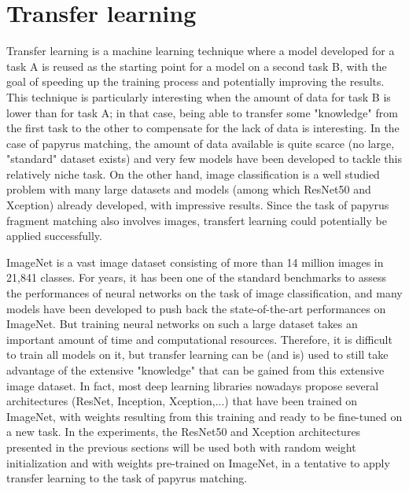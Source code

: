 \documentclass[11pt]{report}
\begin{document}
\section{Transfer learning}\label{sec:transfert}

Transfer learning is a machine learning technique where a model developed for a task A is reused as the starting point for a model on a second task B, with the goal of speeding up the training process and potentially improving the results. This technique is particularly interesting when the amount of data for task B is lower than for task A; in that case, being able to transfer some "knowledge" from the first task to the other to compensate for the lack of data is interesting.\newline
In the case of papyrus matching, the amount of data available is quite scarce (no large, "standard" dataset exists) and very few models have been developed to tackle this relatively niche task. On the other hand, image classification is a well studied problem with many large datasets and models (among which ResNet50 and Xception) already developed, with impressive results. Since the task of papyrus fragment matching also involves images, transfert learning could potentially be applied successfully.\newline

ImageNet is a vast image dataset consisting of more than 14 million images in 21,841 classes. For years, it has been one of the standard benchmarks to assess the performances of neural networks on the task of image classification, and many models have been developed to push back the state-of-the-art performances on ImageNet. But training neural networks on such a large dataset takes an important  amount of time and computational resources. Therefore, it is difficult to train all models on it, but transfer learning can be (and is) used to still take advantage of the extensive "knowledge" that can be gained from this extensive image dataset.\newline
In fact, most deep learning libraries nowadays propose several architectures (ResNet, Inception, Xception,...) that have been trained on ImageNet, with weights resulting from this training and ready to be fine-tuned on a new task.\newline
In the experiments, the ResNet50 and Xception architectures presented in the previous sections will be used both with random weight initialization and with weights pre-trained on ImageNet, in a tentative to apply transfer learning to the task of papyrus matching.\newline
\end{document}
